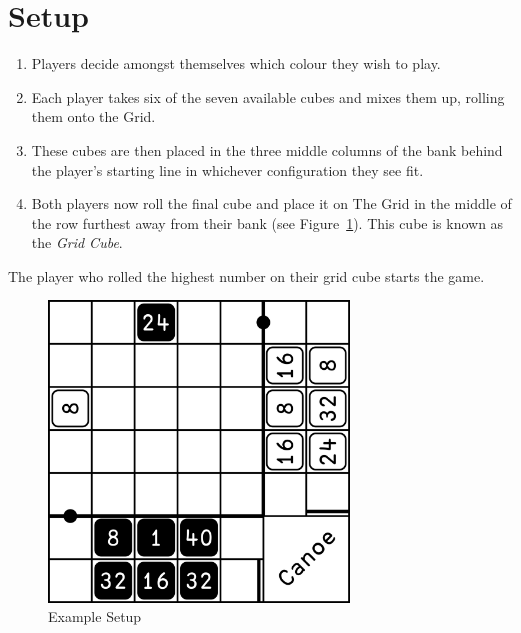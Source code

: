 \section{Setup}
\begin{enumerate}
    \item Players decide amongst themselves which colour they wish to play.
    \item Each player takes six of the seven available cubes and mixes them up, rolling them onto the Grid.
    \item These cubes are then placed in the three middle columns of the bank behind the player's starting line in whichever configuration they see fit.
    \item Both players now roll the final cube and place it on The Grid in the middle of the row furthest away from their bank (see Figure~\ref{fig:setup}). This cube is known as the \textit{Grid Cube}.
\end{enumerate}
The player who rolled the highest number on their grid cube starts the game.

\begin{figure}[!h]
    \centering
    \includegraphics[width=8cm]{../graphics/setup}
    \caption{Example Setup}
    \label{fig:setup}
\end{figure}